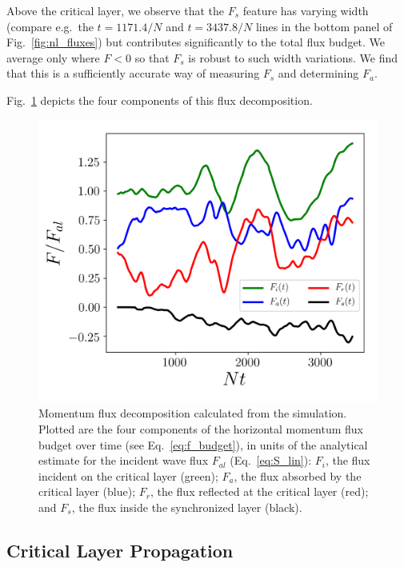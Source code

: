 \documentclass[
        fleqn,
        usenatbib,
        referee,
    ]{mnras}
\begin{document}
Above the critical layer, we observe that the $F_s$ feature has varying width
(compare e.g.\ the $t = 1171.4/N$ and $t = 3437.8/N$ lines in the bottom panel
of Fig.~\ref{fig:nl_fluxes}) but contributes significantly to the total
flux budget. We average only where $F < 0$ so that $F_s$ is robust to such width
variations. We find that this is a sufficiently accurate way of measuring $F_s$
and determining $F_a$.

Fig.~\ref{fig:nl_f_amps2} depicts the four components of this flux decomposition.
\begin{figure}
    \centering
    \includegraphics[width=0.9\columnwidth]{plots/nl_f_amps2.png}
    \caption{Momentum flux decomposition calculated from the simulation. Plotted
    are the four components of the horizontal momentum flux budget over time
    (see Eq.~\eqref{eq:f_budget}), in units of the analytical estimate for the
    incident wave flux $F_{al}$ (Eq.~\eqref{eq:S_lin}): $F_i$, the flux incident
    on the critical layer (green); $F_a$, the flux absorbed by the critical
    layer (blue); $F_r$, the flux reflected at the critical layer (red); and
    $F_s$, the flux inside the synchronized layer
    (black).}\label{fig:nl_f_amps2}
\end{figure}


\subsection{Critical Layer Propagation}\label{ss:cl_prop}
\end{document}
